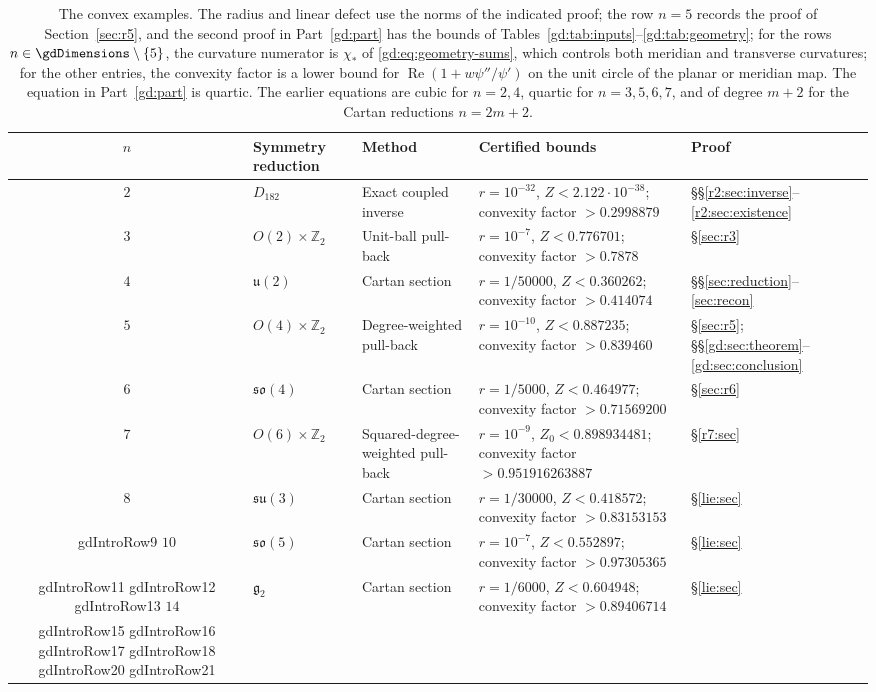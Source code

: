 \documentclass[11pt]{amsart}
\theoremstyle{definition}
\theoremstyle{remark}
\numberwithin{equation}{section}
\newcommand{\Z}{\mathbb{Z}}
\DeclareMathOperator{\re}{Re}
\begin{document}
\begin{table}[htbp]
\centering\footnotesize
\begin{tabular}{@{}c>{\raggedright\arraybackslash}p{2.2cm}>{\raggedright\arraybackslash}p{3.2cm}>{\raggedright\arraybackslash}p{5.5cm}>{\raggedright\arraybackslash}p{1.5cm}@{}}
\toprule
$n$ & Symmetry reduction & Method & Certified bounds & Proof\\
\midrule
$2$ & $D_{182}$ & Exact coupled inverse & $r=10^{-32}$, $Z<2.122\cdot10^{-38}$; convexity factor $>0.2998879$ & \S\S\ref{r2:sec:inverse}--\ref{r2:sec:existence}\\
$3$ & $O(2)\times\Z_2$ & Unit-ball pull-back & $r=10^{-7}$, $Z<0.776701$; convexity factor $>0.7878$ & \S\ref{sec:r3}\\
$4$ & $\mathfrak u(2)$ & Cartan section & $r=1/50000$, $Z<0.360262$; convexity factor $>0.414074$ & \S\S\ref{sec:reduction}--\ref{sec:recon}\\
$5$ & $O(4)\times\Z_2$ & Degree-weighted pull-back & $r=10^{-10}$, $Z<0.887235$; convexity factor $>0.839460$ & \S\ref{sec:r5}; \S\S\ref{gd:sec:theorem}--\ref{gd:sec:conclusion}\\
$6$ & $\mathfrak{so}(4)$ & Cartan section & $r=1/5000$, $Z<0.464977$; convexity factor $>0.71569200$ & \S\ref{sec:r6}\\
$7$ & $O(6)\times\Z_2$ & Squared-degree-weighted pull-back & $r=10^{-9}$, $Z_0<0.898934481$; convexity factor $>0.951916263887$ & \S\ref{r7:sec}\\
$8$ & $\mathfrak{su}(3)$ & Cartan section & $r=1/30000$, $Z<0.418572$; convexity factor $>0.83153153$ & \S\ref{lie:sec}\\
\csname gdIntroRow9\endcsname
$10$ & $\mathfrak{so}(5)$ & Cartan section & $r=10^{-7}$, $Z<0.552897$; convexity factor $>0.97305365$ & \S\ref{lie:sec}\\
\csname gdIntroRow11\endcsname
\csname gdIntroRow12\endcsname
\csname gdIntroRow13\endcsname
$14$ & $\mathfrak g_2$ & Cartan section & $r=1/6000$, $Z<0.604948$; convexity factor $>0.89406714$ & \S\ref{lie:sec}\\
\csname gdIntroRow15\endcsname
\csname gdIntroRow16\endcsname
\csname gdIntroRow17\endcsname
\csname gdIntroRow18\endcsname
\csname gdIntroRow20\endcsname
\csname gdIntroRow21\endcsname
\bottomrule
\end{tabular}
\caption{The convex examples. The radius and linear defect use the norms of the indicated proof; the row $n=5$ records the proof of Section~\ref{sec:r5}, and the second proof in Part~\ref{gd:part} has the bounds of Tables~\ref{gd:tab:inputs}--\ref{gd:tab:geometry}; for the rows $n\in\gdDimensions\setminus\{5\}$, the curvature numerator is $\chi_*$ of \eqref{gd:eq:geometry-sums}, which controls both meridian and transverse curvatures; for the other entries, the convexity factor is a lower bound for $\re(1+w\psi''/\psi')$ on the unit circle of the planar or meridian map. The equation in Part~\ref{gd:part} is quartic. The earlier equations are cubic for $n=2,4$, quartic for $n=3,5,6,7$, and of degree $m+2$ for the Cartan reductions $n=2m+2$.}\label{tab:dimensions}
\end{table}
\end{document}
